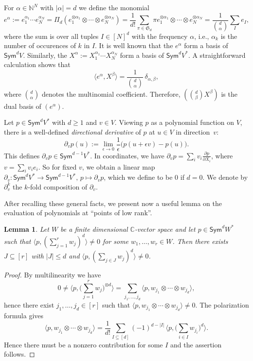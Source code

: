 \documentclass[11pt]{amsart}
\def\C{\mathbb{C}}
\def\Sym{\mathsf{Sym}}
\def\ot{\otimes}
\newcommand{\IN}{\ensuremath{\mathbb{N}}}
\newcommand{\aS}{\ensuremath{\mathfrak{S}}}
\numberwithin{equation}{section}
\newtheorem{lemma}[theorem]{Lemma}
\begin{document}
For $\alpha\in\IN^N$ with $|\alpha|=d$ we define the monomial 
$$
 e^\alpha  := e_1^{\alpha_1}\cdots e_N^{\alpha_N} 
 = \Pi_d(e_1^{\ot\alpha_1}\ot\cdots \ot e_N^{\ot\alpha_N})
 = \frac{1}{d!} \sum_{\pi\in\aS_d} \pi e_1^{\ot\alpha_1}\ot\cdots \ot e_N^{\ot\alpha_N}
 = \frac{1}{{d\choose \alpha}} \sum_I e_I ,
$$
where the sum is over all tuples $I \in [N]^d$ with the frequency $\alpha$, i.e.,
$\alpha_k$ is the number of occurences of $k$ in $I$. 
It is well known that the $e^\alpha$ form a basis of $\Sym^d V$. 
Similarly, the $X^\alpha := X_1^{\alpha_1}\cdots X_N^{\alpha_N}$ form a basis 
of $\Sym^d V^*$.
A straightforward calculation shows that 
\begin{equation}\label{eq:dualsym}
\langle e^\alpha, X^\beta \rangle = \frac{1}{{d\choose \alpha}}\, \delta_{\alpha,\beta} ,
\end{equation}
where ${d\choose \alpha}$ denotes the multinomial coefficient.
Therefore, 
$({d\choose \beta} X^\beta)$ is the dual basis of $(e^\alpha)$. 

Let $p\in\Sym^d V^*$ with $d\ge 1$ and $v\in V$.
Viewing $p$ as a polynomial function on $V$, there is a well-defined 
{\em directional derivative} of $p$ at $u\in V$ in direction~$v$: 
$$
 \partial_v p (u) := \lim_{\epsilon \to 0} \frac{1}{\epsilon} \big( p(u +\epsilon v) - p(u)\big) . 
$$
This defines $\partial_v p \in \Sym^{d-1} V^*$.
In coordinates, we have 
$\partial_v p = \sum_i v_i \frac{\partial p}{\partial X_i}$, 
where $v=\sum_i v_i e_i$.
So for fixed $v$, we obtain a linear map
$\partial_v\colon \Sym^d V^*\to\Sym^{d-1}V^*,\, p\mapsto \partial_v p$, 
which we define to be $0$ if $d=0$. 
We denote by $\partial_v^k$ the $k$-fold composition of $\partial_v$. 


After recalling these general facts, 
we present now a useful lemma on the evaluation of polynomials 
at ``points of low rank''. 

\begin{lemma}\label{le:polar}
Let $W$ be a finite dimensional $\C$-vector space and 
let $p\in\Sym^d W^*$ such that 
$\langle p, (\sum_{j=1}^r w_j)^d \rangle \ne 0$ for some $w_1,\ldots,w_r \in W$.  
Then there exists $J\subseteq [r]$ with $|J| \le d$ and 
$\langle p, (\sum_{j\in J} w_j)^d \rangle \ne 0$. 
\end{lemma}

\begin{proof}
By multilinearity we have 
$$
 0 \ne \Big\langle p, \big(\sum_{j=1}^r w_j \big)^{\otimes d} \Big\rangle = 
 \sum_{j_1,\ldots,j_d} \big\langle p, w_{j_1} \ot \cdots \ot w_{j_d} \big\rangle ,
$$
hence there exist $j_1,\ldots,j_d \in [r]$ such that 
$\langle p, w_{j_1} \ot \cdots \ot w_{j_d} \rangle \ne 0$. 
The polarization formula \cite[p.~5]{dolgachev:03} gives
\begin{equation}\label{eq:pol-formula}
  \big\langle p, w_{j_1}\ot\cdots\ot w_{j_d} \big\rangle = 
  \frac{1}{d!} \sum_{I\subseteq [d]} (-1)^{d-|I|}\,  
    \big\langle p , \big(\sum_{i\in I} w_{j_i} \big)^d\big\rangle  .
\end{equation}
Hence there must be a nonzero contribution for some $I$ 
and the assertion follows.
\end{proof}
\end{document}
